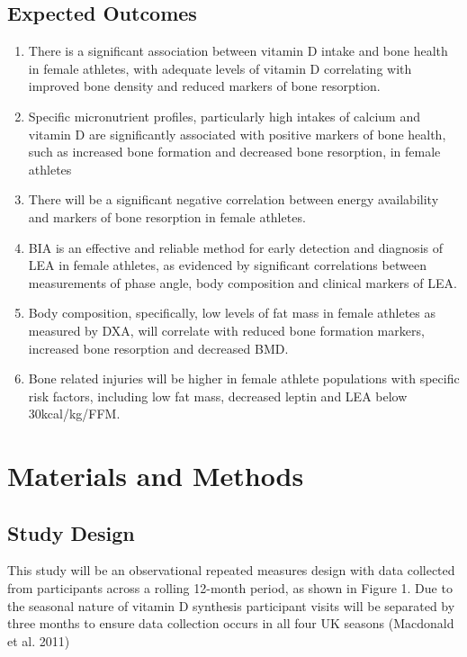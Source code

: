 \documentclass[
]{article}
\begin{document}
\subsection{Expected Outcomes}\label{expected-outcomes}

\begin{enumerate}
\def\labelenumi{\arabic{enumi}.}
\item
  There is a significant association between vitamin D intake and bone health in female athletes, with adequate levels of vitamin D correlating with improved bone density and reduced markers of bone resorption.
\item
  Specific micronutrient profiles, particularly high intakes of calcium and vitamin D are significantly associated with positive markers of bone health, such as increased bone formation and decreased bone resorption, in female athletes
\item
  There will be a significant negative correlation between energy availability and markers of bone resorption in female athletes.
\item
  BIA is an effective and reliable method for early detection and diagnosis of LEA in female athletes, as evidenced by significant correlations between measurements of phase angle, body composition and clinical markers of LEA.
\item
  Body composition, specifically, low levels of fat mass in female athletes as measured by DXA, will correlate with reduced bone formation markers, increased bone resorption and decreased BMD.
\item
  Bone related injuries will be higher in female athlete populations with specific risk factors, including low fat mass, decreased leptin and LEA below 30kcal/kg/FFM.
\end{enumerate}

\section{Materials and Methods}\label{materials-and-methods}

\subsection{Study Design}\label{study-design}

This study will be an observational repeated measures design with data collected from participants across a rolling 12-month period, as shown in Figure 1. Due to the seasonal nature of vitamin D synthesis participant visits will be separated by three months to ensure data collection occurs in all four UK seasons (Macdonald et al. 2011)
\end{document}

